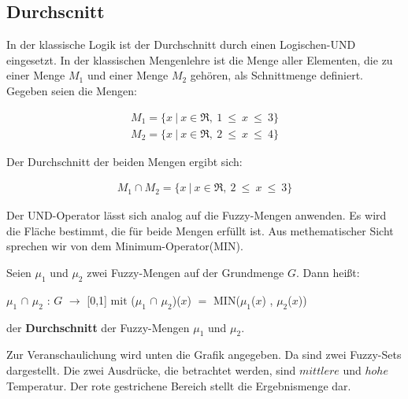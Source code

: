 \subsection{Durchscnitt}\label{AND}

In der klassische Logik ist der Durchschnitt durch einen Logischen-UND eingesetzt. In der klassischen Mengenlehre ist die Menge aller Elementen, die zu einer Menge $M_1$ und einer Menge $M_2$ gehören, als Schnittmenge definiert. Gegeben seien die Mengen:

\begin{align}
M_1 = \{ x \ | \ x \in\Re, \ 1 \ \leq \ x \ \leq \ 3 \} 
\end{align}
\begin{align}
 M_2 = \{ x \ | \ x \in\Re, \ 2 \ \leq \ x \ \leq \ 4 \} 
\end{align}

Der Durchschnitt der beiden Mengen ergibt sich:

\begin{align}
M_1 \cap M_2 = \{ x \ | \ x \in \Re, \ 2 \ \leq \ x \ \leq \ 3 \}
\end{align} 

Der UND-Operator lässt sich analog auf die Fuzzy-Mengen anwenden. Es wird die Fläche bestimmt, die für beide Mengen erfüllt ist. Aus methematischer Sicht sprechen wir von dem Minimum-Operator(MIN).

\begin{definition}
	Seien $\mu_1$ und $\mu_2$ zwei Fuzzy-Mengen auf der Grundmenge $G$. Dann heißt:
		\begin{center}
			$\mu_1$ $\cap$ $\mu_2$ : $G$ $\rightarrow$ [0,1] $\text{mit}$ ($\mu_1$ $\cap$ $\mu_2$)($x$) $=$ MIN($\mu_1$($x$) , $\mu_2$($x$)) 
		\end{center}
	der \textbf{Durchschnitt} der Fuzzy-Mengen $\mu_1$ und $\mu_2$.
\end{definition} 

Zur Veranschaulichung wird unten die Grafik angegeben. Da sind zwei Fuzzy-Sets dargestellt. Die zwei Ausdrücke, die betrachtet werden, sind $mittlere$ und $hohe$ Temperatur. Der rote gestrichene Bereich stellt die Ergebnismenge dar.

